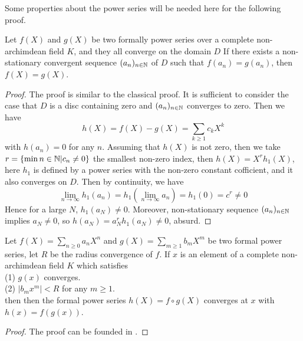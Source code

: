 Some properties about the power series will be needed here for the following proof.
\begin{lemma} \label{cont}
    Let \(f(X)\) and \(g(X)\) be two formally power series over a complete non-archimdean field \(K\), and they all converge on the domain \(D\) If there exists a non-stationary convergent sequence \((a_n)_{n \in \mathbb{N}}\) of \(D\) such that \(f(a_n)=g(a_n)\), then \(f(X) = g(X)\).

    \begin{proof}
        The proof is similar to the classical proof. It is sufficient to consider the case that \(D\) is a disc containing zero and \((a_n)_{n \in \mathbb{N}}\) converges to zero. Then we have 
        \[h(X) = f(X)-g(X) = \sum_{k\geq 1} c_k X^k\]
        with \(h(a_n) = 0\) for any \(n\). Assuming that \(h(X)\) is not zero, then we take \(r = \{\min{n \in \mathbb{N}| c_n \neq 0}\}\) the smallest non-zero index, then \(h(X)=X^rh_1(X)\), here \(h_1\) is defined by a power series with the non-zero constant cofficient, and it also converges on \(D\). Then by continuity, we have
        \[ \lim_{n \rightarrow \infty} h_1(a_n) = h_1(\lim_{n \rightarrow \infty}a_n) = h_1(0) = c^r \neq 0\]
        Hence for a large \(N\), \(h_1(a_N) \neq 0\). Moreover, non-stationary sequence \((a_n)_{n\in \mathbb{N}}\) implies \(a_N \neq 0\), so \(h(a_N) = a_N^rh_1(a_N)\neq 0\), absurd.
    \end{proof}

    \begin{lemma}[composition] \label{composition}
        Let \(f(X) = \sum_{n \geq 0} a_nX^n\) and \(g(X) = \sum_{m\geq 1}b_mX^m\) be two formal power series, let \(R\) be the radius convergence of \(f\). If \(x\) is an element of a complete non-archimdean field \(K\) which satisfies\\
        (1) \(g(x)\) converges. \\
        (2) \(|b_mx^m| < R\) for any \(m \geq 1\). \\
        then then the formal power series \(h(X) = f\circ g (X)\) converges at \(x\) with \(h(x)=f(g(x))\).

        \begin{proof}
            The proof can be founded in \cite[Chapter 4]{cohen2007number}.
        \end{proof}
    \end{lemma}
\end{lemma}

